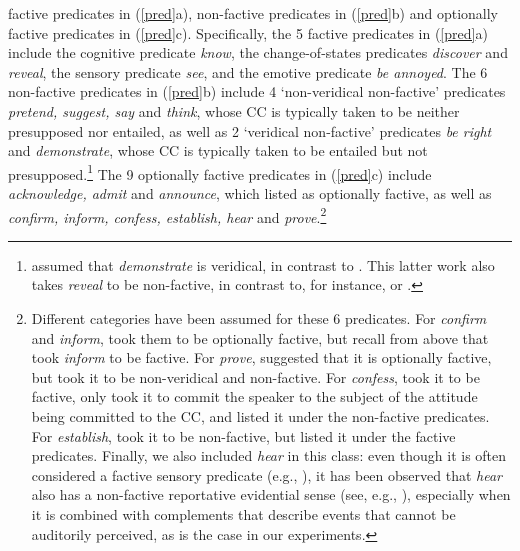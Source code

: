 \documentclass[11pt,fleqn]{article}
\newcommand{\6}{\mbox{$[\hspace*{-.6mm}[$}}
\newcommand{\9}{\mbox{$]\hspace*{-.6mm}]$}}
\begin{document}
factive predicates in (\ref{pred}a), non-factive predicates in (\ref{pred}b) and optionally factive predicates in (\ref{pred}c). Specifically, the 5 factive predicates in (\ref{pred}a) include the cognitive predicate {\em know}, the change-of-states predicates {\em discover} and {\em reveal}, the sensory predicate {\em see}, and the emotive predicate {\em be annoyed}. The 6 non-factive predicates in (\ref{pred}b) include 4 `non-veridical non-factive' predicates {\em pretend, suggest, say} and {\em think}, whose CC is typically taken to be neither presupposed nor entailed, as well as  2 `veridical non-factive' predicates {\em be right} and {\em demonstrate}, whose CC is typically taken to be entailed but not presupposed.\footnote{\citet{anand-hacquard2014} assumed that {\em demonstrate} is veridical, in contrast to \citealt{anand-etal2019}. This latter work also takes {\em reveal} to be non-factive, in contrast to, for instance, \citealt{egre2008,wyse} or \citealt{tbd-variability}.}  The 9 optionally factive predicates in (\ref{pred}c) include {\em acknowledge, admit} and {\em announce}, which \citealt{kiparsky-kiparsky70} listed as optionally factive, as well as {\em confirm, inform, confess, establish, hear} and {\em prove}.\footnote{Different categories have been assumed for these 6 predicates. For {\em confirm} and {\em inform}, \citet{anand-hacquard2014} took them to be optionally factive, but recall from above that \citet{schlenker10} took {\em inform} to be factive. For {\em prove}, \citet{white-rawlins-nels2018} suggested that it is optionally factive, but \citet{anand-hacquard2014} took it to be non-veridical and non-factive. For {\em confess}, \citet{swanson2012} took it to be factive, \citet{karttunen2016} only took it to commit the speaker to the subject of the attitude being committed to the CC, and \citet{wyse} listed it under the non-factive predicates. For {\em establish}, \citet{swanson2012} took it to be non-factive, but \citet{wyse} listed it under the factive predicates. Finally, we also included {\em hear} in this class: even though it is often considered a factive sensory predicate (e.g., \citealt{beaver-belly,anand-hacquard2014}), it has been observed that {\em hear} also has a non-factive reportative evidential sense (see, e.g., \citealt{anderson86,simons07}), especially when it is combined with complements that describe events that cannot be auditorily perceived, as is the case in our experiments.}
\end{document}
